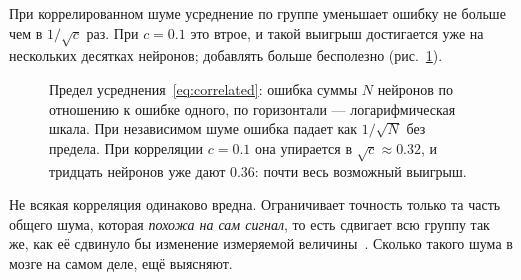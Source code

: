 \begin{keyblock}
\begin{proposition}
\label{prop:pooling}
При коррелированном шуме усреднение по группе уменьшает ошибку не больше чем в $1/\sqrt{c}$ раз. При $c=0.1$ это втрое, и такой выигрыш достигается уже на нескольких десятках нейронов; добавлять больше бесполезно (рис.~\ref{fig:pooling}).
\end{proposition}
\end{keyblock}

\begin{figure}[t]
\centering
{}
\caption{Предел усреднения~\eqref{eq:correlated}: ошибка суммы $N$ нейронов по отношению к ошибке одного, по горизонтали --- логарифмическая шкала. При независимом шуме ошибка падает как $1/\sqrt{N}$ без предела. При корреляции $c=0.1$ она упирается в $\sqrt{c}\approx0.32$, и тридцать нейронов уже дают $0.36$: почти весь возможный выигрыш.}
\label{fig:pooling}
\end{figure}

Не всякая корреляция одинаково вредна. Ограничивает точность только та часть общего шума, которая \emph{похожа на сам сигнал}, то есть сдвигает всю группу так же, как её сдвинуло бы изменение измеряемой величины~\cite{MorenoBote2014}. Сколько такого шума в мозге на самом деле, ещё выясняют.

